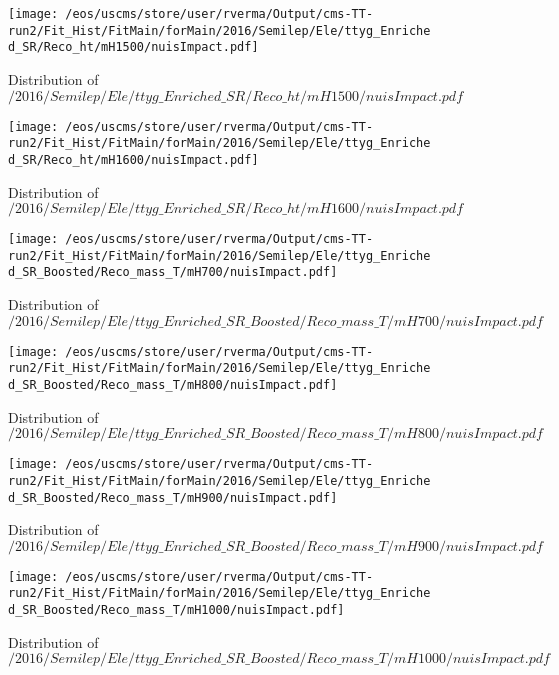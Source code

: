 \begin{figure}
\centering
\texttt{[image: /eos/uscms/store/user/rverma/Output/cms-TT-run2/Fit\_Hist/FitMain/forMain/2016/Semilep/Ele/ttyg\_Enriched\_SR/Reco\_ht/mH1500/nuisImpact.pdf]}
\caption{Distribution of $/2016/Semilep/Ele/ttyg\_Enriched\_SR/Reco\_ht/mH1500/nuisImpact.pdf$}
\end{figure}

\begin{figure}
\centering
\texttt{[image: /eos/uscms/store/user/rverma/Output/cms-TT-run2/Fit\_Hist/FitMain/forMain/2016/Semilep/Ele/ttyg\_Enriched\_SR/Reco\_ht/mH1600/nuisImpact.pdf]}
\caption{Distribution of $/2016/Semilep/Ele/ttyg\_Enriched\_SR/Reco\_ht/mH1600/nuisImpact.pdf$}
\end{figure}

\begin{figure}
\centering
\texttt{[image: /eos/uscms/store/user/rverma/Output/cms-TT-run2/Fit\_Hist/FitMain/forMain/2016/Semilep/Ele/ttyg\_Enriched\_SR\_Boosted/Reco\_mass\_T/mH700/nuisImpact.pdf]}
\caption{Distribution of $/2016/Semilep/Ele/ttyg\_Enriched\_SR\_Boosted/Reco\_mass\_T/mH700/nuisImpact.pdf$}
\end{figure}

\begin{figure}
\centering
\texttt{[image: /eos/uscms/store/user/rverma/Output/cms-TT-run2/Fit\_Hist/FitMain/forMain/2016/Semilep/Ele/ttyg\_Enriched\_SR\_Boosted/Reco\_mass\_T/mH800/nuisImpact.pdf]}
\caption{Distribution of $/2016/Semilep/Ele/ttyg\_Enriched\_SR\_Boosted/Reco\_mass\_T/mH800/nuisImpact.pdf$}
\end{figure}

\begin{figure}
\centering
\texttt{[image: /eos/uscms/store/user/rverma/Output/cms-TT-run2/Fit\_Hist/FitMain/forMain/2016/Semilep/Ele/ttyg\_Enriched\_SR\_Boosted/Reco\_mass\_T/mH900/nuisImpact.pdf]}
\caption{Distribution of $/2016/Semilep/Ele/ttyg\_Enriched\_SR\_Boosted/Reco\_mass\_T/mH900/nuisImpact.pdf$}
\end{figure}

\begin{figure}
\centering
\texttt{[image: /eos/uscms/store/user/rverma/Output/cms-TT-run2/Fit\_Hist/FitMain/forMain/2016/Semilep/Ele/ttyg\_Enriched\_SR\_Boosted/Reco\_mass\_T/mH1000/nuisImpact.pdf]}
\caption{Distribution of $/2016/Semilep/Ele/ttyg\_Enriched\_SR\_Boosted/Reco\_mass\_T/mH1000/nuisImpact.pdf$}
\end{figure}

